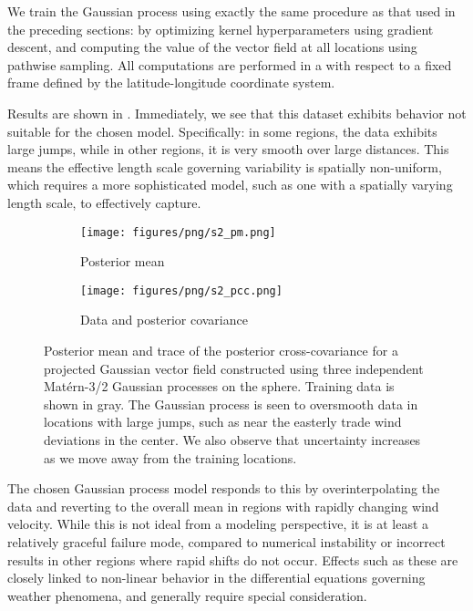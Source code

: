 \documentclass[11pt]{book}
\begin{document}
We train the Gaussian process using exactly the same procedure as that used in the preceding sections: by optimizing kernel hyperparameters using gradient descent, and computing the value of the vector field at all locations using pathwise sampling.
All computations are performed in a with respect to a fixed frame defined by the latitude-longitude coordinate system.

Results are shown in .
Immediately, we see that this dataset exhibits behavior not suitable for the chosen model.
Specifically: in some regions, the data exhibits large jumps, while in other regions, it is very smooth over large distances.
This means the effective length scale governing variability is spatially non-uniform, which requires a more sophisticated model, such as one with a spatially varying length scale, to effectively capture.

\begin{figure}
\begin{subfigure}{0.49\textwidth}
\texttt{[image: figures/png/s2\_pm.png]}
\caption{Posterior mean}
\end{subfigure}
\begin{subfigure}{0.49\textwidth}
\texttt{[image: figures/png/s2\_pcc.png]}
\caption{Data and posterior covariance}
\end{subfigure}
\caption[Posterior Gaussian vector field: climate data]{Posterior mean and trace of the posterior cross-covariance for a projected Gaussian vector field constructed using three independent Matérn-3/2 Gaussian processes on the sphere. Training data is shown in gray. The Gaussian process is seen to oversmooth data in locations with large jumps, such as near the easterly trade wind deviations in the center. We also observe that uncertainty increases as we move away from the training locations.}
\label{fig:posterior-vector-field}
\end{figure}

The chosen Gaussian process model responds to this by overinterpolating the data and reverting to the overall mean in regions with rapidly changing wind velocity.
While this is not ideal from a modeling perspective, it is at least a relatively graceful failure mode, compared to numerical instability or incorrect results in other regions where rapid shifts do not occur.
Effects such as these are closely linked to non-linear behavior in the differential equations governing weather phenomena, and generally require special consideration.
\end{document}
